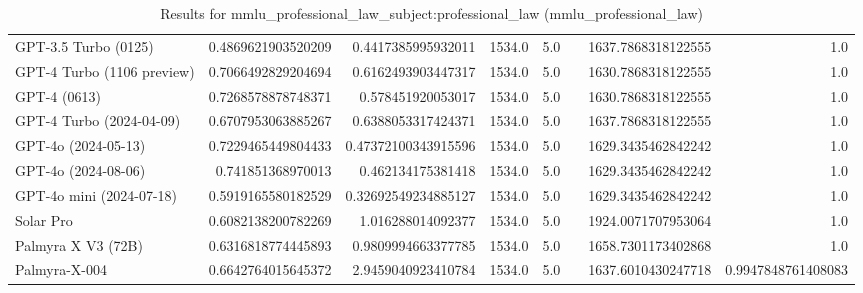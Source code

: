\begin{table}[htp]
{\begin{tabular}{lrrrrrrr}
GPT-3.5 Turbo (0125) & 0.4869621903520209 & 0.4417385995932011 & 1534.0 & 5.0 &  & 1637.7868318122555 & 1.0 \\
GPT-4 Turbo (1106 preview) & 0.7066492829204694 & 0.6162493903447317 & 1534.0 & 5.0 &  & 1630.7868318122555 & 1.0 \\
GPT-4 (0613) & 0.7268578878748371 & 0.578451920053017 & 1534.0 & 5.0 &  & 1630.7868318122555 & 1.0 \\
GPT-4 Turbo (2024-04-09) & 0.6707953063885267 & 0.6388053317424371 & 1534.0 & 5.0 &  & 1637.7868318122555 & 1.0 \\
GPT-4o (2024-05-13) & 0.7229465449804433 & 0.47372100343915596 & 1534.0 & 5.0 &  & 1629.3435462842242 & 1.0 \\
GPT-4o (2024-08-06) & 0.741851368970013 & 0.462134175381418 & 1534.0 & 5.0 &  & 1629.3435462842242 & 1.0 \\
GPT-4o mini (2024-07-18) & 0.5919165580182529 & 0.32692549234885127 & 1534.0 & 5.0 &  & 1629.3435462842242 & 1.0 \\
Solar Pro & 0.6082138200782269 & 1.016288014092377 & 1534.0 & 5.0 &  & 1924.0071707953064 & 1.0 \\
Palmyra X V3 (72B) & 0.6316818774445893 & 0.9809994663377785 & 1534.0 & 5.0 &  & 1658.7301173402868 & 1.0 \\
Palmyra-X-004 & 0.6642764015645372 & 2.9459040923410784 & 1534.0 & 5.0 &  & 1637.6010430247718 & 0.9947848761408083 \\
\bottomrule
\end{tabular}}
\caption{Results for mmlu_professional_law_subject:professional_law (mmlu_professional_law)}
\label{fig:mmlu_professional_law_subject:professional_law (mmlu_professional_law)}
\end{table}